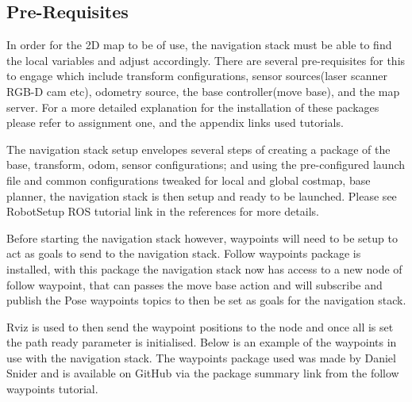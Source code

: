 \documentclass[a4paper, 10pt]{IEEEconf}
\begin{document}

\subsection{Pre-Requisites}


In order for the 2D map to be of use, the navigation stack must be able to find the local variables and adjust accordingly. There are several pre-requisites for this to engage which include transform configurations, sensor sources(laser scanner RGB-D cam etc), odometry source, the base controller(move base), and the map server. For a more detailed explanation for the installation of these packages please refer to assignment one, and the appendix links used tutorials.

The navigation stack setup envelopes several steps of creating a package of the base, transform, odom, sensor configurations; and using the pre-configured launch file and common configurations tweaked for local and global costmap, base planner, the navigation stack is then setup and ready to be launched. Please see RobotSetup ROS tutorial link in the references for more details.

Before starting the navigation stack however, waypoints will need to be setup to act as goals to send to the navigation stack. Follow waypoints package is installed, with this package the navigation stack now has access to a new node of follow waypoint, that can passes the move base action and will subscribe and publish the Pose waypoints topics to then be set as goals for the navigation stack.

Rviz is used to then send the waypoint positions to the node and once all is set the path ready parameter is initialised. Below is an example of the waypoints in use with the navigation stack. The waypoints package used was made by Daniel Snider and is available on GitHub via the package summary link from the follow waypoints tutorial. 
\end{document}
